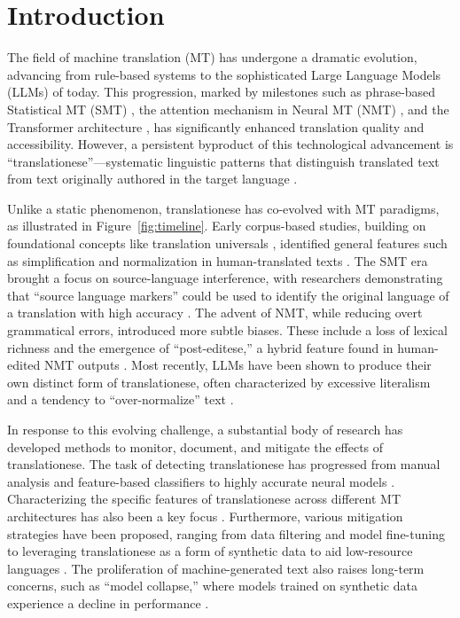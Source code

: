 \section{Introduction}

The field of machine translation (MT) has undergone a dramatic evolution, advancing from rule-based systems to the sophisticated Large Language Models (LLMs) of today. This progression, marked by milestones such as phrase-based Statistical MT (SMT) \cite{koehn2003statistical}, the attention mechanism in Neural MT (NMT) \cite{bahdanau2015neural}, and the Transformer architecture \cite{vaswani2017attention}, has significantly enhanced translation quality and accessibility. However, a persistent byproduct of this technological advancement is ``translationese''---systematic linguistic patterns that distinguish translated text from text originally authored in the target language \cite{gellerstam1986translationese}.

Unlike a static phenomenon, translationese has co-evolved with MT paradigms, as illustrated in Figure~\ref{fig:timeline}. Early corpus-based studies, building on foundational concepts like translation universals \cite{baker1993corpus}, identified general features such as simplification and normalization in human-translated texts \cite{laviosa1998corpus}. The SMT era brought a focus on source-language interference, with researchers demonstrating that ``source language markers'' could be used to identify the original language of a translation with high accuracy \cite{van2008source,koppel2011translationese}. The advent of NMT, while reducing overt grammatical errors, introduced more subtle biases. These include a loss of lexical richness \cite{vanmassenhove2019getting} and the emergence of ``post-editese,'' a hybrid feature found in human-edited NMT outputs \cite{toral2019post}. Most recently, LLMs have been shown to produce their own distinct form of translationese, often characterized by excessive literalism and a tendency to ``over-normalize'' text \cite{li2025how,wang2024benchmarking}.

In response to this evolving challenge, a substantial body of research has developed methods to monitor, document, and mitigate the effects of translationese. The task of detecting translationese has progressed from manual analysis and feature-based classifiers \cite{baroni2006new,volansky2015features} to highly accurate neural models \cite{pylypenko2021comparing,amponsah2022explaining}. Characterizing the specific features of translationese across different MT architectures has also been a key focus \cite{riley2020translationese,zhou2024comparison}. Furthermore, various mitigation strategies have been proposed, ranging from data filtering and model fine-tuning \cite{lembersky2013improving,jourdan2025translationese} to leveraging translationese as a form of synthetic data to aid low-resource languages \cite{dabre2024pretraining}. The proliferation of machine-generated text also raises long-term concerns, such as ``model collapse,'' where models trained on synthetic data experience a decline in performance \cite{shumailov2024ai}.

